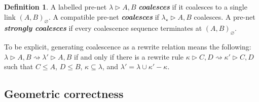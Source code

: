 \documentclass{article}
\theoremstyle{definition}
\newtheorem{definition}{Definition}
\theoremstyle{plain}
\newcommand\defn[1]{\textit{\textbf{#1}}}
\newcommand\+{+}
\renewcommand\*{\times}
\newcommand\fv{\textsc{fv}}
\newcommand\net[3]{#1\triangleright #2,#3}
\newcommand\comp\frown
\newcommand\clink[3][\sigma]{(#2,#3)_{#1}}
\newcommand\minus{\mathop{/\mathchoice{\kern-3pt}{\kern-3pt}{\kern-2.5pt}{\kern-2pt}/}}
\newcommand\coals{\rightsquigarrow}
\newcommand\coal{\coals}%
\begin{document}
\begin{definition}
%
%
%
A labelled pre-net $\net\lambda AB$ \defn{coalesces} if it coalesces to a single link $\clink[\varnothing]AB$. A compatible pre-net \defn{coalesces} if $\net{\lambda_\star}AB$ coalesces. A pre-net \defn{strongly coalesces} if every coalescence sequence terminates at $\clink[\varnothing]AB$.
\end{definition}

To be explicit, generating coalescence as a rewrite relation means the following: $\net\lambda AB\coal \net{\lambda'}AB$ if and only if there is a rewrite rule $\net\kappa CD\coal\net{\kappa'} CD$ such that $C\leq A$, $D\leq B$, $\kappa\subseteq\lambda$, and $\lambda'=\lambda\cup\kappa'-\kappa$.





\subsection{Geometric correctness}
\end{document}
